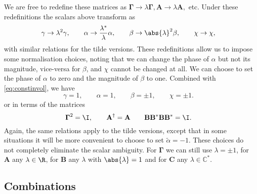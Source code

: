 \documentclass[11pt]{article}
\newcommand{\Gammab}{\boldsymbol{\Gamma}}
\newcommand{\A}{\mathbf{A}}
\newcommand{\B}{\mathbf{B}}
\renewcommand{\C}{\mathbf{C}}
\newcommand{\Cb}{\mathbb{C}}
\newcommand{\alphat}{\tilde{\alpha}}
\begin{document}
We are free to redefine these matrices as $\Gammab \rightarrow \lambda \Gammab, \A \rightarrow \lambda \A,$ etc.
Under these redefinitions the scalars above transform as
%
\begin{equation*}
  \gamma \rightarrow \lambda^2 \gamma, \qquad
  \alpha \rightarrow \frac{\lambda^\ast}{\lambda} \alpha, \qquad
  \beta \rightarrow \abs{\lambda}^2 \beta, \qquad
  \chi \rightarrow \chi,
\end{equation*}
%
with similar relations for the tilde versions.
These redefinitions allow us to impose some normalisation choices, noting that we can change the phase of $\alpha$ but not its magnitude, vice-versa for $\beta$, and $\chi$ cannot be changed at all.
We can choose to set the phase of \(\alpha\) to zero and the magnitude of \(\beta\) to one.
Combined with \cref{eq:constinvol}, we have  
%
\begin{equation}\label{eq:normscalar}
  \gamma = 1, \qquad
  \alpha = 1, \qquad
  \beta = \pm 1, \qquad
  \chi = \pm 1.
\end{equation}
%
or in terms of the matrices
%
\begin{equation}\label{eq:normmats}
  \Gammab^2 = \I, \qquad
  \A^\dag = \A  \qquad
  \B \B^\ast \B \B^\ast = \I.
\end{equation}
%
Again, the same relations apply to the tilde versions, except that in some situations it will be more convenient to choose to set \( \alphat = -1 \).
These choices do not completely eliminate the scalar ambiguity.
For $\Gammab$ we can still use $\lambda = \pm 1$, for $\A$ any $\lambda \in \R$, for $\B$ any $\lambda$ with $\abs{\lambda} = 1$ and for $\C$ any \(\lambda \in \Cb^\ast\).


\subsection{Combinations}\label{sec:combo}
\end{document}

